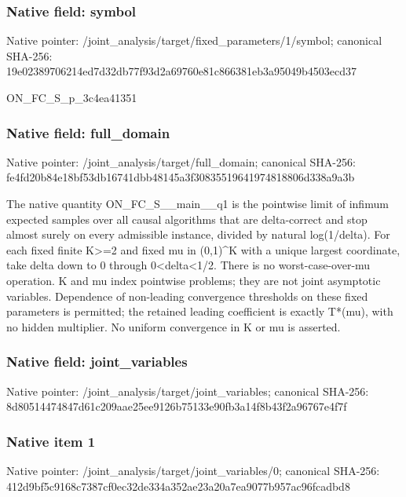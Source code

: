 \documentclass[10pt,a4paper]{article}
\begin{document}
\subsubsection{Native field: symbol}
Native pointer: /joint\_\allowbreak{}analysis/target/fixed\_\allowbreak{}parameters/1/symbol; canonical SHA-256: 19e02389706214ed7d32db77f93d2a69760e81c866381eb3a95049b4503ecd37

\begingroup\raggedright\sloppy ON\_\allowbreak{}FC\_\allowbreak{}S\_\allowbreak{}p\_\allowbreak{}3c4ea41351\par\endgroup

\subsubsection{Native field: full\_\allowbreak{}domain}
Native pointer: /joint\_\allowbreak{}analysis/target/full\_\allowbreak{}domain; canonical SHA-256: fe4fd20b84e18bf53db16741dbb48145a3f30835519641974818806d338a9a3b

\begingroup\raggedright\sloppy The native quantity ON\_\allowbreak{}FC\_\allowbreak{}S\_\allowbreak{}\_\allowbreak{}main\_\allowbreak{}\_\allowbreak{}q1 is the pointwise limit of infimum expected samples over all causal algorithms that are delta-correct and stop almost surely on every admissible instance,\allowbreak{} divided by natural log(1/\allowbreak{}delta). For each fixed finite K>=\allowbreak{}2 and fixed mu in (0,\allowbreak{}1)\textasciicircum{}K with a unique largest coordinate,\allowbreak{} take delta down to 0 through 0<delta<1/\allowbreak{}2. There is no worst-case-over-mu operation. K and mu index pointwise problems;\allowbreak{} they are not joint asymptotic variables. Dependence of non-leading convergence thresholds on these fixed parameters is permitted;\allowbreak{} the retained leading coefficient is exactly T*(mu),\allowbreak{} with no hidden multiplier. No uniform convergence in K or mu is asserted.\par\endgroup

\subsubsection{Native field: joint\_\allowbreak{}variables}
Native pointer: /joint\_\allowbreak{}analysis/target/joint\_\allowbreak{}variables; canonical SHA-256: 8d80514474847d61c209aae25ee9126b75133e90fb3a14f8b43f2a96767e4f7f

\subsubsection{Native item 1}
Native pointer: /joint\_\allowbreak{}analysis/target/joint\_\allowbreak{}variables/0; canonical SHA-256: 412d9bf5c9168c7387cf0ec32de334a352ae23a20a7ea9077b957ac96fcadbd8
\end{document}

